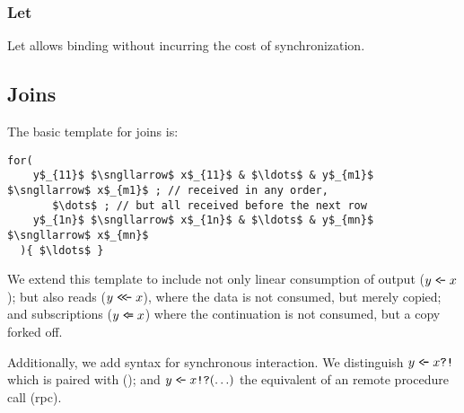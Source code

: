 \subsubsection{Let}

Let allows binding without incurring the cost of synchronization.


\subsection{Joins}

The basic template for joins is:

\begin{lstlisting}[mathescape=true]
  for(
    y$_{11}$ $\sngllarrow$ x$_{11}$ & $\ldots$ & y$_{m1}$ $\sngllarrow$ x$_{m1}$ ; // received in any order, 
       $\dots$ ; // but all received before the next row
    y$_{1n}$ $\sngllarrow$ x$_{1n}$ & $\ldots$ & y$_{mn}$ $\sngllarrow$ x$_{mn}$
  ){ $\ldots$ }
\end{lstlisting}

We extend this template to include not only linear consumption of
output ($y \;\texttt{<\!-}\; x$); but also reads ($y \;\texttt{<\!<\!-}\;
x$), where the data is not consumed, but merely copied; and
subscriptions ($y \;\texttt{<\!=}\; x$) where the continuation is not
consumed, but a copy forked off.

Additionally, we add syntax for synchronous interaction. We
distinguish $y \;\texttt{<\!-}\; x\texttt{?!}$ which is paired with ();
and $y \;\texttt{<\!-}\; x\texttt{!?}( \ldots )$ the equivalent of an
remote procedure call (rpc).

